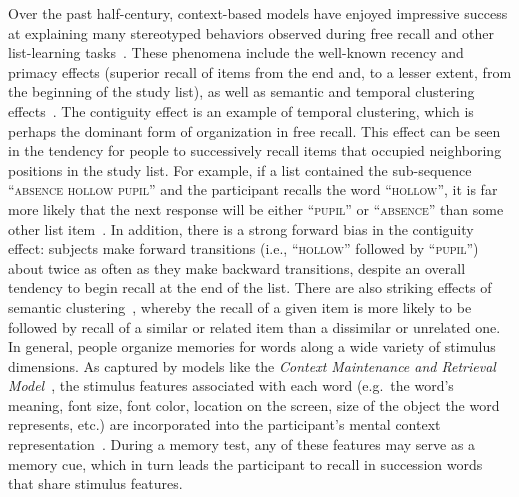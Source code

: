 \documentclass[11pt]{article}
\begin{document}
Over the past half-century, context-based models have enjoyed impressive
success at explaining many stereotyped behaviors observed during free recall
and other list-learning tasks~\citep{Este55a, RaaiShif80, GlenEtal83,
HowaKaha02a, SiroEtal05, KimbEtal07, PolyKaha08, PolyEtalTulv, SedeEtal08,
PolyEtal09, ShanHowa12}. These phenomena include the well-known recency and
primacy effects (superior recall of items from the end and, to a lesser extent,
from the beginning of the study list), as well as semantic and temporal
clustering effects~\citep{KahaEtal08}. The contiguity effect is an example of
temporal clustering, which is perhaps the dominant form of organization in free
recall. This effect can be seen in the tendency for people to successively
recall items that occupied neighboring positions in the study list. For
example, if a list contained the sub-sequence \textsc{``absence hollow pupil''}
and the participant recalls the word \textsc{``hollow''}, it is far more likely
that the next response will be either \textsc{``pupil''} or
\textsc{``absence''} than some other list item~\citep{Kaha96}. In addition,
there is a strong forward bias in the contiguity effect: subjects make forward
transitions (i.e., \textsc{``hollow''} followed by \textsc{``pupil''}) about
twice as often as they make backward transitions, despite an overall tendency
to begin recall at the end of the list. There are also striking effects of
semantic clustering~\citep{RomnEtal93, Bous53, BousEtal54, JenkRuss52,
MannKaha12}, whereby the recall of a given item is more likely to be followed
by recall of a similar or related item than a dissimilar or unrelated one. In
general, people organize memories for words along a wide variety of stimulus
dimensions. As captured by models like the \textit{Context Maintenance and
Retrieval Model}~\citep{PolyEtal09}, the stimulus features associated with each
word (e.g.\ the word's meaning, font size, font color, location on the screen,
size of the object the word represents, etc.) are incorporated into the
participant's mental context representation~\citep{SmitVela01, MannEtal15,
Mann20, MannEtal11, MannEtal12}. During a memory test, any of these features
may serve as a memory cue, which in turn leads the participant to recall in
succession words that share stimulus features.

\end{document}
